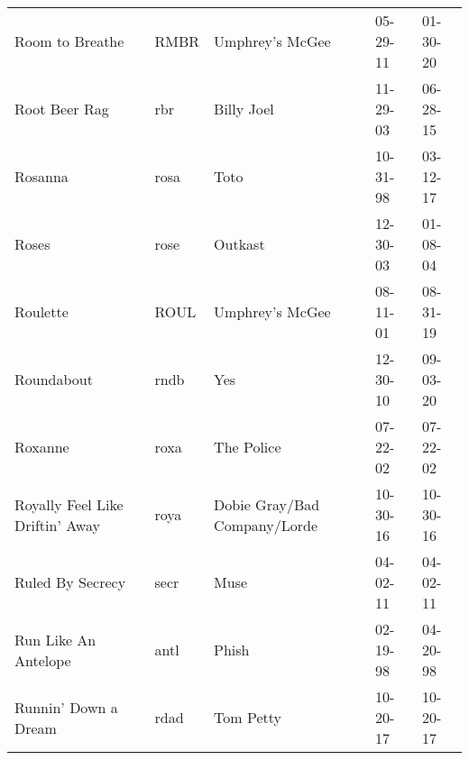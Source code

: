 \begin{longtable}{p{}p{}p{}p{}p{}}
                                                         Room to Breathe &          RMBR &                                          Umphrey's McGee &              05-29-11 &             01-30-20 \\
                                                           Root Beer Rag &           rbr &                                               Billy Joel &              11-29-03 &             06-28-15 \\
                                                                 Rosanna &          rosa &                                                     Toto &              10-31-98 &             03-12-17 \\
                                                                   Roses &          rose &                                                  Outkast &              12-30-03 &             01-08-04 \\
                                                                Roulette &          ROUL &                                          Umphrey's McGee &              08-11-01 &             08-31-19 \\
                                                              Roundabout &          rndb &                                                      Yes &              12-30-10 &             09-03-20 \\
                                                                 Roxanne &          roxa &                                               The Police &              07-22-02 &             07-22-02 \\
                                         Royally Feel Like Driftin' Away &          roya &                             Dobie Gray/Bad Company/Lorde &              10-30-16 &             10-30-16 \\
                                                        Ruled By Secrecy &          secr &                                                     Muse &              04-02-11 &             04-02-11 \\
                                                    Run Like An Antelope &          antl &                                                    Phish &              02-19-98 &             04-20-98 \\
                                                    Runnin' Down a Dream &          rdad &                                                Tom Petty &              10-20-17 &             10-20-17 \\

\end{longtable}
